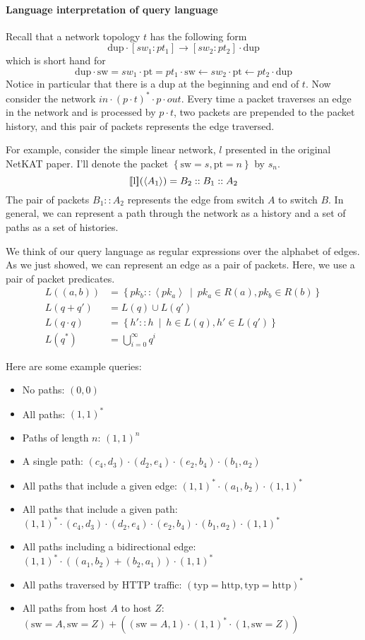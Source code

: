 \documentclass[12pt]{article}
\newcommand{\set}[1]{\left\{#1\right\}}
\newcommand{\setst}[2]{\left\{#1 \>\middle|\> #2 \right\}}
\newcommand{\carets}[1]{\left\langle #1 \right\rangle}
\newcommand{\pt}{\text{pt}}
\newcommand{\sw}{\text{sw}}
\newcommand{\typ}{\text{typ}}
\newcommand{\http}{\text{http}}
\newcommand{\dup}{\text{dup}}
\newcommand{\denote}[1]{\text{$[\![ $#1$ ]\!]$}}
\begin{document}
\paragraph{Language interpretation of query language} Recall that a network
topology $t$ has the following form
\[
  \dup \cdot [sw_1:pt_1] \to [sw_2:pt_2] \cdot \dup
\]
which is short hand for
\[
  \dup \cdot
  \sw =     sw_1 \cdot \pt =     pt_1 \cdot
  \sw \gets sw_2 \cdot \pt \gets pt_2 \cdot
  \dup
\]
Notice in particular that there is a dup at the beginning and end of $t$.
Now consider the network $in \cdot (p \cdot t)^* \cdot p \cdot out$. Every time
a packet traverses an edge in the network and is processed by $p \cdot t$, two
packets are prepended to the packet history, and this pair of packets
represents the edge traversed.

For example, consider the simple linear network, $l$ presented in the original
NetKAT paper. I'll denote the packet $\set{\sw=s, \pt=n}$ by $s_n$.
\[
  \denote{l}(\carets{A_1}) = B_2 :: B_1 :: A_2
\]
The pair of packets $B_1::A_2$ represents the edge from switch $A$ to switch
$B$. In general, we can represent a path through the network as a history and a
set of paths as a set of histories.

We think of our query language as regular expressions over the alphabet of
edges. As we just showed, we can represent an edge as a pair of packets. Here,
we use a pair of packet predicates.
\begin{align*}
  L((a, b))    &= \setst{pk_b :: \carets{pk_a}}{pk_a \in R(a), pk_b \in R(b)} \\
  L(q + q')    &= L(q) \cup L(q') \\
  L(q \cdot q) &= \setst{h' :: h}{h \in L(q), h' \in L(q')} \\
  L(q^*)       &= \bigcup_{i=0}^\infty q^i
\end{align*}

Here are some example queries:
\begin{itemize}
  \item No paths:
    $(0, 0)$
  \item All paths:
    $(1, 1)^*$
  \item Paths of length $n$:
    $(1, 1)^n$
  \item A single path:
    $(c_4, d_3) \cdot (d_2, e_4) \cdot (e_2, b_4) \cdot (b_1, a_2)$
  \item All paths that include a given edge:
    $(1, 1)^* \cdot (a_1, b_2) \cdot (1, 1)^*$
  \item All paths that include a given path:
    $(1, 1)^* \cdot (c_4, d_3) \cdot (d_2, e_4) \cdot (e_2, b_4) \cdot (b_1, a_2) \cdot (1, 1)^*$
  \item All paths including a bidirectional edge:
    $(1, 1)^* \cdot ((a_1, b_2) + (b_2, a_1)) \cdot (1, 1)^*$
  \item All paths traversed by HTTP traffic:
    $(\typ=\http, \typ=\http)^*$
  \item All paths from host $A$ to host $Z$:
    $(\sw=A, \sw=Z) + ((\sw=A, 1) \cdot (1, 1)^* \cdot (1, \sw=Z))$
\end{itemize}
\end{document}
